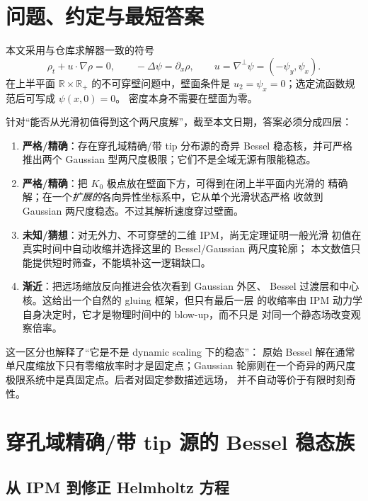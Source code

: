 \documentclass[11pt,a4paper,fontset=fandol]{ctexart}
\newcommand{\R}{\mathbb{R}}
\newcommand{\grad}{\nabla}
\newcommand{\perpgrad}{\nabla^\perp}
\newcommand{\known}{\textcolor{green!45!black}{\textbf{严格/精确}}}
\newcommand{\asymstatus}{\textcolor{blue!65!black}{\textbf{渐近}}}
\newcommand{\openq}{\textcolor{red!65!black}{\textbf{未知/猜想}}}
\begin{document}
\tableofcontents

\section{问题、约定与最短答案}

本文采用与仓库求解器一致的符号
\begin{equation}
  \rho_t+u\cdot\grad\rho=0,
  \qquad
  -\Delta\psi=\partial_x\rho,
  \qquad
  u=\perpgrad\psi=(-\psi_y,\psi_x).
  \label{eq:ipm}
\end{equation}
在上半平面 $\R\times\R_+$ 的不可穿壁问题中，壁面条件是
$u_2=\psi_x=0$；选定流函数规范后可写成 $\psi(x,0)=0$。
密度本身不需要在壁面为零。

针对“能否从光滑初值得到这个两尺度解”，截至本文日期，答案必须分成四层：
\begin{enumerate}
  \item \known：存在穿孔域精确/带 tip 分布源的奇异 Bessel 稳态核，并可严格
  推出两个 Gaussian 型两尺度极限；它们不是全域无源有限能稳态。
  \item \known：把 $K_0$ 极点放在壁面下方，可得到在闭上半平面内光滑的
  精确解；在一个\emph{扩展的}各向异性坐标系中，它从单个光滑状态严格
  收敛到 Gaussian 两尺度稳态。不过其解析速度穿过壁面。
  \item \openq：对无外力、不可穿壁的二维 IPM，尚无定理证明一般光滑
  初值在真实时间中自动收缩并选择这里的 Bessel/Gaussian 两尺度轮廓；
  本文数值只能提供短时筛查，不能填补这一逻辑缺口。
  \item \asymstatus：把远场缩放反向推进会依次看到 Gaussian 外区、
  Bessel 过渡层和中心核。这给出一个自然的 gluing 框架，但只有最后一层
  的收缩率由 IPM 动力学自身决定时，它才是物理时间中的 blow-up，而不只是
  对同一个静态场改变观察倍率。
\end{enumerate}

这一区分也解释了“它是不是 dynamic scaling 下的稳态”：
原始 Bessel 解在通常单尺度缩放下只有零缩放率时才是固定点；Gaussian
轮廓则在一个奇异的两尺度极限系统中是真固定点。后者对固定参数描述远场，
并不自动等价于有限时刻奇性。

\section{穿孔域精确/带 tip 源的 Bessel 稳态族}

\subsection{从 IPM 到修正 Helmholtz 方程}
\end{document}
